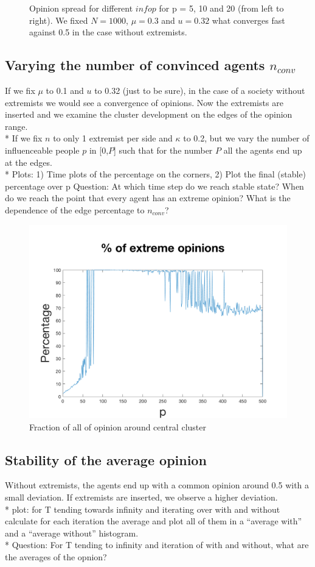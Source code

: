 \documentclass[11pt]{article}
\begin{document}
\begin{figure}[!htb]
\caption{Opinion spread for different $infop$ for p = 5, 10 and 20 (from left to right). We fixed $N = 1000$, $\mu = 0.3$ and $u = 0.32$ what converges fast against 0.5 in the case without extremists.}
\label{fig:varinfop}
\end{figure}



\subsection{Varying the number of convinced agents \texorpdfstring{$n_{conv}$}{TEXT}}
If we fix $\mu$ to 0.1 and $u$ to 0.32 (just to be sure), in the case of a society without extremists we would see a convergence of opinions. Now the extremists are inserted and we examine the cluster development on the edges of the opinion range. \\*
If we fix $n$ to only 1 extremist per side and $\kappa$ to 0.2, but we vary the number of influenceable people $p$ in [0,$P$] such that for the number $P$ all the agents end up at the edges. \\*
Plots: 1) Time plots of the percentage on the corners, 2) Plot the final (stable) percentage over p
Question: At which time step do we reach stable state? When do we reach the point that every agent has an extreme opinion? What is the dependence of the edge percentage to $n_{conv}$?

\begin{figure}[!htb]
\center

  \includegraphics[width=0.6\linewidth]{gen_plot_intervall_201712182172720605e+01.png}
  \caption{Fraction of all of opinion around central cluster}
  \label{fig:varynconv}
\end{figure}

\subsection{Stability of the average opinion}
Without extremists, the agents end up with a common opinion around 0.5 with a small deviation. If extremists are inserted, we observe a higher deviation. \\*
plot: for T tending towards infinity and iterating over with and without calculate for each iteration the average and plot all of them in a “average with” and a “average without” histogram. \\*
Question: For T tending to infinity and iteration of with and without, what are the averages of the opnion?
\end{document}
